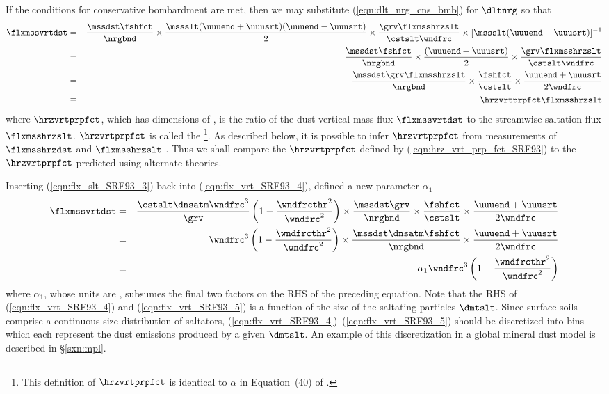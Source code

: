 \documentclass[12pt,twoside]{book}
\begin{document}
If the conditions for conservative bombardment are met, then we may
substitute (\ref{eqn:dlt_nrg_cns_bmb}) for $\dltnrg$ so that
\begin{eqnarray}
\flxmssvrtdst 
& = & 
\frac{\mssdst \fshfct}{\nrgbnd } \times
\frac{\mssslt ( \uuuend + \uuusrt ) ( \uuuend - \uuusrt )}{2} \times
\frac{\grv \flxmsshrzslt}{\cstslt \wndfrc } \times
[ \mssslt ( \uuuend - \uuusrt ) ]^{-1} \nonumber \\
& = & 
\frac{\mssdst \fshfct}{\nrgbnd } \times
\frac{( \uuuend + \uuusrt )}{2} \times
\frac{\grv \flxmsshrzslt}{\cstslt \wndfrc } \nonumber \\
& = & 
\label{eqn:flx_vrt_SRF93_4}
\frac{\mssdst \grv \flxmsshrzslt}{\nrgbnd } \times
\frac{\fshfct}{\cstslt } \times
\frac{\uuuend + \uuusrt}{2 \wndfrc } \\
& \equiv & 
\label{eqn:hrz_vrt_prp_fct_SRF93}
\hrzvrtprpfct \flxmsshrzslt 
\end{eqnarray}
where $\hrzvrtprpfct$, which has dimensions of \xm, is the ratio of 
the dust vertical mass flux $\flxmssvrtdst$ to the streamwise saltation 
flux $\flxmsshrzslt$.
$\hrzvrtprpfct$ is called the %
\footnote{This definition of
$\hrzvrtprpfct$ is identical to $\alpha$ in Equation~(40) of
\cite{MaB95}.}.
As described below, it is possible to infer $\hrzvrtprpfct$ from
measurements of $\flxmsshrzdst$ and $\flxmsshrzslt$ \cite[]{SRF93}.
Thus we shall compare the $\hrzvrtprpfct$ defined by
(\ref{eqn:hrz_vrt_prp_fct_SRF93}) to the $\hrzvrtprpfct$ predicted  
using alternate theories.

Inserting (\ref{eqn:flx_slt_SRF93_3}) back into
(\ref{eqn:flx_vrt_SRF93_4}), \cite{SRF93} defined a new parameter
$\alpha_{1}$ 
\begin{eqnarray}
\flxmssvrtdst 
& = & 
\frac{\cstslt \dnsatm \wndfrc^{3}}{\grv }
\left( 1 - \frac{\wndfrcthr^{2}}{\wndfrc^{2} } \right) \times
\frac{\mssdst \grv}{\nrgbnd } \times
\frac{\fshfct}{\cstslt } \times
\frac{\uuuend + \uuusrt}{2 \wndfrc } \nonumber \\
& = & 
\wndfrc^{3} \left( 1 - \frac{\wndfrcthr^{2}}{\wndfrc^{2} } \right) \times
\frac{\mssdst \dnsatm \fshfct}{\nrgbnd } \times
\frac{\uuuend + \uuusrt}{2 \wndfrc } \nonumber \\
& \equiv & 
\alpha_{1} \wndfrc^{3}
\left( 1 - \frac{\wndfrcthr^{2}}{\wndfrc^{2} } \right)
\label{eqn:flx_vrt_SRF93_5}
\end{eqnarray}
where $\alpha_{1}$, whose units are \kgsSxmF, subsumes the final two
factors on the RHS of the preceding equation.
Note that the RHS of (\ref{eqn:flx_vrt_SRF93_4}) and
(\ref{eqn:flx_vrt_SRF93_5}) is a function of the size of the saltating
particles $\dmtslt$. 
Since surface soils comprise a continuous size distribution of
saltators, (\ref{eqn:flx_vrt_SRF93_4})--(\ref{eqn:flx_vrt_SRF93_5})
should be discretized into bins which each represent the dust
emissions produced by a given $\dmtslt$.
An example of this discretization in a global mineral dust model is
described in \S\ref{sxn:mpl}. 
\end{document}
